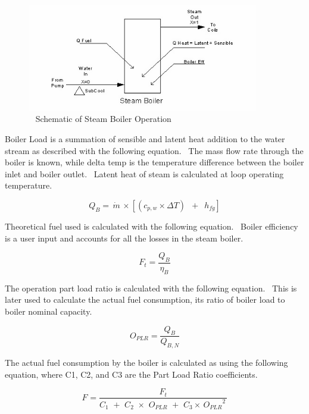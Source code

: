 \begin{figure}[hbtp] %
\centering
\includegraphics[width=0.9\textwidth, height=0.9\textheight, keepaspectratio=true]{media/image2933.png}
\caption{  Schematic of Steam Boiler Operation \protect \label{fig:schematic-of-steam-boiler-operation}}
\end{figure}

Boiler Load is a summation of sensible and latent heat addition to the water stream as described with the following equation.~ The mass flow rate through the boiler is known, while delta temp is the temperature difference between the boiler inlet and boiler outlet.~ Latent heat of steam is calculated at loop operating temperature.

\begin{equation}
{Q_B} = \,\dot m\, \times \left[ {({c_{p,w}} \times \Delta T)\,\,\, + \,\,\,{h_{fg}}} \right]
\end{equation}

Theoretical fuel used is calculated with the following equation.~ Boiler efficiency is a user input and accounts for all the losses in the steam boiler.

\begin{equation}
{F_t} = \frac{{{Q_B}}}{{{\eta_B}}}
\end{equation}

The operation part load ratio is calculated with the following equation.~ This is later used to calculate the actual fuel consumption, its ratio of boiler load to boiler nominal capacity.

\begin{equation}
{O_{PLR}} = \frac{{{Q_B}}}{{{Q_{B,N}}}}
\end{equation}

The actual fuel consumption by the boiler is calculated as using the following equation, where C1, C2, and C3 are the Part Load Ratio coefficients.

\begin{equation}
{F_{}} = \frac{{{F_t}}}{{{C_1}\,\, + \,\,{C_2}\,\, \times \,\,{O_{PLR}}\,\, + \,\,{C_3} \times \,{O_{PLR}}^2\,}}
\end{equation}

